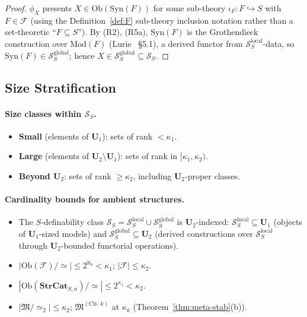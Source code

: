 \documentclass[11pt]{article}
\theoremstyle{plain}
\theoremstyle{definition}
\newcommand{\cS}{\mathcal{S}}
\newcommand{\cF}{\mathcal{F}}
\newcommand{\fM}{\mathfrak{M}}
\newcommand{\Ob}{\mathrm{Ob}}
\newcommand{\Syn}{\mathrm{Syn}}
\newcommand{\Mod}{\mathrm{Mod}}
\begin{document}
\begin{proof}
$\phi_X$ presents $X \in \Ob(\Syn(F))$ for some sub-theory $\iota_F : F \hookrightarrow S$ with $F \in \cF$ (using the Definition~\ref{def:F} sub-theory inclusion notation rather than a set-theoretic ``$F \subseteq S$'').  By (R2), (R5a), $\Syn(F)$ is the Grothendieck construction over $\Mod(F)$ (Lurie~\cite{LurieHTT} \S 5.1), a derived functor from $\cS_S^{\mathrm{local}}$-data, so $\Syn(F) \in \cS_S^{\mathrm{global}}$; hence $X \in \cS_S^{\mathrm{global}} \subseteq \cS_S$.
\end{proof}

\subsection{Size Stratification}\label{sec:size-stratification}

\paragraph{Size classes within $\cS_S$.}
\begin{itemize}
\item \textbf{Small} (elements of $\mathbf{U}_1$): sets of rank $< \kappa_1$.
\item \textbf{Large} (elements of $\mathbf{U}_2 \setminus \mathbf{U}_1$): sets of rank in $[\kappa_1, \kappa_2)$.
\item \textbf{Beyond $\mathbf{U}_2$}: sets of rank $\geq \kappa_2$, including $\mathbf{U}_2$-proper classes.
\end{itemize}

\paragraph{Cardinality bounds for ambient structures.}
\begin{itemize}
\item The $S$-definability class $\cS_S = \cS_S^{\mathrm{local}} \cup \cS_S^{\mathrm{global}}$ is $\mathbf{U}_2$-indexed: $\cS_S^{\mathrm{local}} \subseteq \mathbf{U}_1$ (objects of $\mathbf{U}_1$-sized models) and $\cS_S^{\mathrm{global}} \subseteq \mathbf{U}_2$ (derived constructions over $\cS_S^{\mathrm{local}}$ through $\mathbf{U}_2$-bounded functorial operations).
\item $|\Ob(\cF)/\!\simeq| \leq 2^{\aleph_0} < \kappa_1$; $|\cF| \leq \kappa_2$.
\item $|\Ob(\mathbf{StrCat}_{S, n})/\!\simeq| \leq 2^{\kappa_1} < \kappa_2$.
\item $|\fM / \!\simeq_2| \leq \kappa_2$; $\fM^{(\mathrm{Cls}\cdot k)}$ at $\kappa_k$ (Theorem~\ref{thm:meta-stab}(b)).
\end{itemize}
\end{document}
